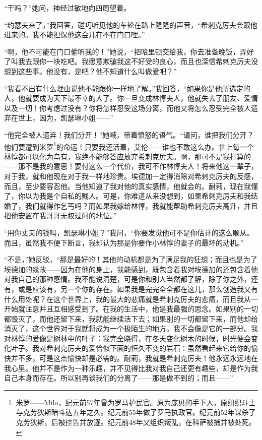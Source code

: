 \par “干吗？”她问，神经过敏地向四周望着。
\par “约瑟夫来了，”我回答，碰巧听见他的车轮在路上隆隆的声音，“希刺克厉夫会跟他进来的。我不能担保他这会儿在不在门口哩。”
\par “啊，他不可能在门口偷听我的！”她说，“把哈里顿交给我，你去准备晚饭，弄好了叫我去跟你一块吃吧。我愿意欺骗我这不好受的良心，而且也深信希刺克厉夫没想到这些事。他没有，是吧？他不知道什么叫做爱吧？”
\par “我看不出有什么理由说他不能跟你一样地了解。”我回答，“如果你是他所选定的人，他就要成为天下最不幸的人了。你一旦变成林惇夫人，他就失去了朋友、爱情以及一切！你考虑过没有？你将怎样忍受这场分离，而他又将怎么忍受完全被人遗弃在世上，因为，凯瑟琳小姐——”
\par “他完全被人遗弃！我们分开！”她喊，带着愤怒的语气。“请问，谁把我们分开？他们要遭到米罗\footnote{米罗——Milo，纪元前57年曾为罗马护民官。原为庞贝的手下人，原组织斗士与克劳狄斯暗斗达五年之久。纪元前55年做了罗马执政官。纪元前52年谋杀了克劳狄斯，后被控告并放逐。纪元前48年又组织叛乱，在科萨被捕并被处死。}的命运！只要我还活着，艾伦——谁也不敢这么办。世上每一个林惇都可以化为乌有，我绝不能够答应放弃希刺克厉夫。啊，那可不是我打算的——那不是我的意思！要付这么一个代价，我可不作林惇夫人！将来他这一辈子，对于我，就和他现在对于我一样地珍贵。埃德加一定得消除对希刺克厉夫的反感，而且，至少要容忍他。当他知道了我对他的真实感情，他就会的。耐莉，现在我懂了，你以为我是个自私的贱人。可是，你难道从来没想到，如果希刺克厉夫和我结婚了，我们就得作乞丐吗？而如果我嫁给林惇，我就能帮助希刺克厉夫高升，并且把他安置在我哥哥无权过问的地位。”
\par “用你丈夫的钱吗，凯瑟琳小姐？”我问，“你要发觉他可不是你估计的这么顺从。而且，虽然我不便下断言，我却认为那是你要作小林惇的妻子的最坏的动机。”
\par “不是，”她反驳，“那是最好的！其他的动机都是为了满足我的狂想；而且也是为了埃德加的缘故——因为在他的身上，我能感到，既包含着我对埃德加的还包含着他对我自己的那种感情。我不能说清楚，可是你和别人当然都了解，除了你之外，还有，或是应该有，另一个你的存在。如果我是完完全全都在这儿，那么创造我又有什么用处呢？在这个世界上，我的最大的悲痛就是希刺克厉夫的悲痛，而且我从一开始就注意并且互相感受到了。在我的生活中，他是我最强的思念。如果别的一切都毁灭了，而他还留下来，我就能继续活下去；如果别的一切都留下来，而他却给消灭了，这个世界对于我就将成为一个极陌生的地方。我不会像是它的一部分。我对林惇的爱像是树林中的叶子：我完全晓得，在冬天变化树木的时候，时光便会变化叶子。我对希刺克厉夫的爱恰似下面的恒久不变的岩石：虽然看起来它给你的愉快并不多，可是这点愉快却是必需的。耐莉，我就是希刺克厉夫！他永远永远地在我心里。他并不是作为一种乐趣，并不见得比我对我自己还更有趣些，却是作为我自己本身而存在。所以别再谈我们的分离了——那是做不到的；而且——”
